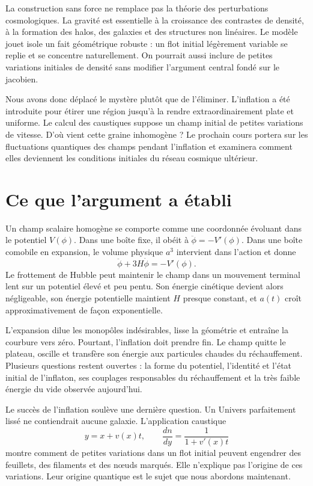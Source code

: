 La construction sans force ne remplace pas la théorie des perturbations cosmologiques. La gravité est essentielle à la croissance des contrastes de densité, à la formation des halos, des galaxies et des structures non linéaires. Le modèle jouet isole un fait géométrique robuste : un flot initial légèrement variable se replie et se concentre naturellement. On pourrait aussi inclure de petites variations initiales de densité sans modifier l’argument central fondé sur le jacobien.

Nous avons donc déplacé le mystère plutôt que de l’éliminer. L’inflation a été introduite pour étirer une région jusqu’à la rendre extraordinairement plate et uniforme. Le calcul des caustiques suppose un champ initial de petites variations de vitesse. D’où vient cette graine inhomogène ? Le prochain cours portera sur les fluctuations quantiques des champs pendant l’inflation et examinera comment elles deviennent les conditions initiales du réseau cosmique ultérieur.

\section{Ce que l’argument a établi}

Un champ scalaire homogène se comporte comme une coordonnée évoluant dans le potentiel \(V(\phi)\). Dans une boîte fixe, il obéit à \(\ddot\phi=-V'(\phi)\). Dans une boîte comobile en expansion, le volume physique \(a^3\) intervient dans l’action et donne
\[
\ddot\phi+3H\dot\phi=-V'(\phi).
\]
Le frottement de Hubble peut maintenir le champ dans un mouvement terminal lent sur un potentiel élevé et peu pentu. Son énergie cinétique devient alors négligeable, son énergie potentielle maintient \(H\) presque constant, et \(a(t)\) croît approximativement de façon exponentielle.

L’expansion dilue les monopôles indésirables, lisse la géométrie et entraîne la courbure vers zéro. Pourtant, l’inflation doit prendre fin. Le champ quitte le plateau, oscille et transfère son énergie aux particules chaudes du réchauffement. Plusieurs questions restent ouvertes : la forme du potentiel, l’identité et l’état initial de l’inflaton, ses couplages responsables du réchauffement et la très faible énergie du vide observée aujourd’hui.

Le succès de l’inflation soulève une dernière question. Un Univers parfaitement lissé ne contiendrait aucune galaxie. L’application caustique
\[
y=x+v(x)t,
\qquad
\frac{dn}{dy}=\frac{1}{1+v'(x)t}
\]
montre comment de petites variations dans un flot initial peuvent engendrer des feuillets, des filaments et des nœuds marqués. Elle n’explique pas l’origine de ces variations. Leur origine quantique est le sujet que nous abordons maintenant.
